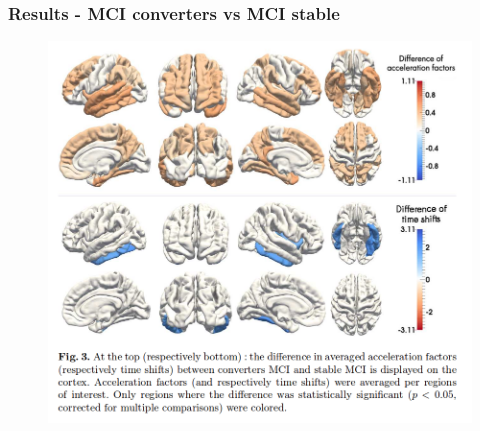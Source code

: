 \documentclass[10pt,xcolor=table]{beamer}
\begin{document}
\begin{frame}
\frametitle{Results - MCI converters vs MCI stable}

\begin{figure}
\includegraphics[scale=0.27]{res_fig3.png}
\end{figure}

\end{frame}


\fontsize{6pt}{7.2}\selectfont
{}

% 
% 


 
\end{document}
